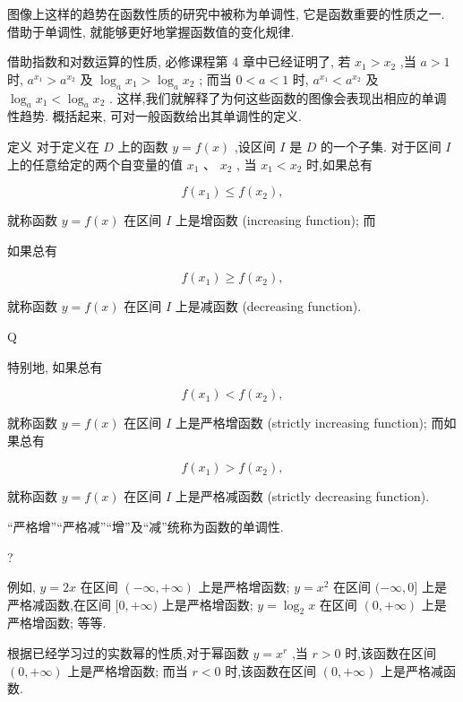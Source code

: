 \documentclass[10pt]{article}
\begin{document}
图像上这样的趋势在函数性质的研究中被称为单调性, 它是函数重要的性质之一. 借助于单调性, 就能够更好地掌握函数值的变化规律.

借助指数和对数运算的性质, 必修课程第 4 章中已经证明了, 若 \({x}_{1} > {x}_{2}\) ,当 \(a > 1\) 时, \({a}^{{x}_{1}} > {a}^{{x}_{2}}\) 及 \({\log }_{a}{x}_{1} > {\log }_{a}{x}_{2}\) ; 而当 \(0 < a < 1\) 时, \({a}^{{x}_{1}} < {a}^{{x}_{2}}\) 及 \({\log }_{a}{x}_{1} < {\log }_{a}{x}_{2}\) . 这样,我们就解释了为何这些函数的图像会表现出相应的单调性趋势. 概括起来, 可对一般函数给出其单调性的定义.

定义 对于定义在 \(D\) 上的函数 \(y = f\left( x\right)\) ,设区间 \(I\) 是 \(D\) 的一个子集. 对于区间 \(I\) 上的任意给定的两个自变量的值 \({x}_{1}\text{ 、 }{x}_{2}\) , 当 \({x}_{1} < {x}_{2}\) 时,如果总有

\[
f\left( {x}_{1}\right)  \leq  f\left( {x}_{2}\right) ,
\]

就称函数 \(y = f\left( x\right)\) 在区间 \(I\) 上是增函数 (increasing function); 而

如果总有

\[
f\left( {x}_{1}\right)  \geq  f\left( {x}_{2}\right) ,
\]

就称函数 \(y = f\left( x\right)\) 在区间 \(I\) 上是减函数 (decreasing function).

Q

特别地, 如果总有

\[
f\left( {x}_{1}\right)  < f\left( {x}_{2}\right) ,
\]

就称函数 \(y = f\left( x\right)\) 在区间 \(I\) 上是严格增函数 (strictly increasing function); 而如果总有

\[
f\left( {x}_{1}\right)  > f\left( {x}_{2}\right) ,
\]

就称函数 \(y = f\left( x\right)\) 在区间 \(I\) 上是严格减函数 (strictly decreasing function).

“严格增”“严格减”“增”及“减”统称为函数的单调性.

?

例如, \(y = {2x}\) 在区间 \(\left( {-\infty , + \infty }\right)\) 上是严格增函数; \(y = {x}^{2}\) 在区间 \(( - \infty ,0\rbrack\) 上是严格减函数,在区间 \(\lbrack 0, + \infty )\) 上是严格增函数; \(y = {\log }_{2}x\) 在区间 \(\left( {0, + \infty }\right)\) 上是严格增函数; 等等.

根据已经学习过的实数幂的性质,对于幂函数 \(y = {x}^{r}\) ,当 \(r > 0\) 时,该函数在区间 \(\left( {0, + \infty }\right)\) 上是严格增函数; 而当 \(r < 0\) 时,该函数在区间 \(\left( {0, + \infty }\right)\) 上是严格减函数.
\end{document}
